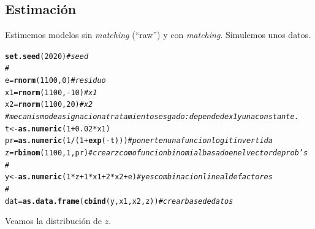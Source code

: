 \documentclass[onesided]{article}\usepackage[]{graphicx}\usepackage[]{color}
\makeatletter
\newcommand{\hlnum}[1]{\textcolor[rgb]{0.686,0.059,0.569}{#1}}%
\newcommand{\hlcom}[1]{\textcolor[rgb]{0.678,0.584,0.686}{\textit{#1}}}%
\newcommand{\hlopt}[1]{\textcolor[rgb]{0,0,0}{#1}}%
\newcommand{\hlstd}[1]{\textcolor[rgb]{0.345,0.345,0.345}{#1}}%
\newcommand{\hlkwb}[1]{\textcolor[rgb]{0.69,0.353,0.396}{#1}}%
\newcommand{\hlkwd}[1]{\textcolor[rgb]{0.737,0.353,0.396}{\textbf{#1}}}%
\newenvironment{kframe}{%
 \def\at@end@of@kframe{}%
 \ifinner\ifhmode%
  \def\at@end@of@kframe{\end{minipage}}%
  \begin{minipage}{\columnwidth}%
 \fi\fi%
 \def\FrameCommand##1{\hskip\@totalleftmargin \hskip-\fboxsep
 \colorbox{shadecolor}{##1}\hskip-\fboxsep
     \hskip-\linewidth \hskip-\@totalleftmargin \hskip\columnwidth}%
 \MakeFramed {\advance\hsize-\width
   \@totalleftmargin\z@ \linewidth\hsize
   \@setminipage}}%
 {\par\unskip\endMakeFramed%
 \at@end@of@kframe}
\newenvironment{knitrout}{}{} %
\makeatother
\begin{document}
\subsection{Estimaci\'on}

Estimemos modelos sin \emph{matching} (``raw'') y con \emph{matching}. Simulemos unos datos.


\begin{knitrout}
\color{fgcolor}\begin{kframe}
\begin{alltt}
\hlkwd{set.seed}\hlstd{(}\hlnum{2020}\hlstd{)} \hlcom{# seed}
\hlcom{#}
\hlstd{e} \hlkwb{=} \hlkwd{rnorm}\hlstd{(}\hlnum{1100}\hlstd{,} \hlnum{0}\hlstd{)} \hlcom{# residuo }
\hlstd{x1} \hlkwb{=} \hlkwd{rnorm}\hlstd{(}\hlnum{1100}\hlstd{,} \hlopt{-}\hlnum{10}\hlstd{)} \hlcom{# x1}
\hlstd{x2} \hlkwb{=} \hlkwd{rnorm}\hlstd{(}\hlnum{1100}\hlstd{,} \hlnum{20}\hlstd{)} \hlcom{# x2}
\hlcom{# mecanismo de asignacion a tratamiento sesgado: depende de x1 y una constante.}
\hlstd{t} \hlkwb{<-} \hlkwd{as.numeric}\hlstd{(}\hlnum{1} \hlopt{+} \hlnum{0.02}\hlopt{*}\hlstd{x1)}
\hlstd{pr} \hlkwb{=} \hlkwd{as.numeric}\hlstd{(}\hlnum{1}\hlopt{/}\hlstd{(}\hlnum{1}\hlopt{+}\hlkwd{exp}\hlstd{(}\hlopt{-}\hlstd{t)))} \hlcom{# poner t en una funcion logit invertida}
\hlstd{z} \hlkwb{=} \hlkwd{rbinom}\hlstd{(}\hlnum{1100}\hlstd{,}\hlnum{1}\hlstd{,pr)} \hlcom{# crear z como funcion binomial basado en el vector de prob's}
\hlcom{#}
\hlstd{y} \hlkwb{<-} \hlkwd{as.numeric}\hlstd{(}\hlnum{1}\hlopt{*}\hlstd{z} \hlopt{+} \hlnum{1}\hlopt{*}\hlstd{x1} \hlopt{+} \hlnum{2}\hlopt{*}\hlstd{x2} \hlopt{+} \hlstd{e)} \hlcom{# y es combinacion lineal de factores}
\hlcom{#}
\hlstd{dat} \hlkwb{=} \hlkwd{as.data.frame}\hlstd{(}\hlkwd{cbind}\hlstd{(y, x1, x2,z))} \hlcom{# crear base de datos}
\end{alltt}
\end{kframe}
\end{knitrout}

Veamos la distribuci\'on de $z$. 
\end{document}
